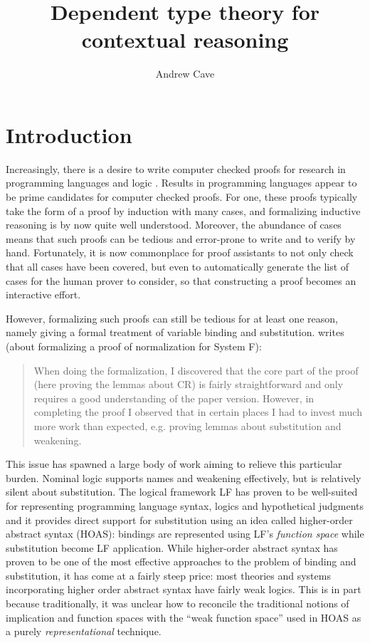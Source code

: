 \documentclass{article}
\author{Andrew Cave}
\title{Dependent type theory for contextual reasoning}
\begin{document}
\maketitle

\section{Introduction}


Increasingly, there is a desire to write computer checked proofs for
research in programming languages and logic
\citep{POPLMark}. Results in programming languages appear to be prime
candidates for computer checked proofs. For one, these proofs typically take the
form of a proof by induction with many cases, and formalizing inductive
reasoning is by now quite well understood. Moreover, the abundance of cases means that such proofs can be
tedious and error-prone to write and to verify by hand. Fortunately, it is now commonplace for proof
assistants to not only check that all cases have been covered, but
even to automatically generate the list of cases for the human prover
to consider, so that constructing a proof becomes an interactive
effort.

However, formalizing such proofs can still be tedious for at least one reason,
namely giving a formal treatment of variable binding and
substitution. \cite{Altenkirch93} writes (about
formalizing a proof of normalization for System F):

\begin{quote}
When doing the formalization, I discovered that the core part of the
proof (here proving the lemmas about CR) is fairly straightforward and
only requires a good understanding of the paper version. However, in
completing the proof I observed that in certain places I had to invest
much more work than expected, e.g. proving lemmas about substitution
and weakening.
\end{quote}

This issue has spawned a large body of work aiming to relieve this
particular burden. Nominal logic \citep{Pitts2003165} supports names and weakening
effectively, but is relatively silent about substitution. The
logical framework LF \citep{Harper93jacm} has proven to be well-suited
for representing programming language syntax, logics and hypothetical
judgments and it provides direct support for substitution using an
idea called higher-order abstract syntax (HOAS): bindings are
represented using LF's \emph{function space} while substitution
become LF application. While higher-order
abstract syntax has proven to be one of the most 
effective approaches to the problem of binding and substitution, it
has come at a fairly steep price: most theories and systems
incorporating higher order abstract syntax have fairly weak
logics. This is in part because traditionally, it was unclear how to
reconcile the traditional notions of implication and function spaces with
the ``weak function space'' used in HOAS as a purely \emph{representational} technique.
\end{document}
